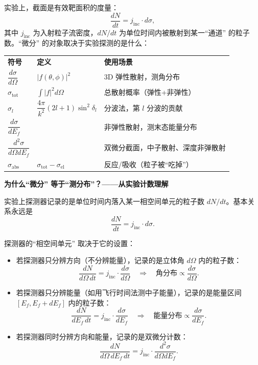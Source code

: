 \begin{derivationbox}[``截面'' 家族：各种微分截面的定义]

实验上，截面是有效靶面积的度量：
\[
\frac{dN}{dt} = j_{\text{inc}} \cdot d\sigma,
\]
其中 $j_{\text{inc}}$ 为入射粒子流密度，$dN/dt$ 为单位时间内被散射到某一``通道'' 的粒子数。``微分'' 的对象取决于实验探测的是什么：

\begin{tabular}{lll}
\textbf{符号} & \textbf{定义} & \textbf{使用场景} \\
$\dfrac{d\sigma}{d\Omega}$ & $|f(\theta,\phi)|^2$ & 3D 弹性散射，测角分布 \\
$\sigma_{\text{tot}}$ & $\int |f|^2 d\Omega$ & 总散射概率（弹性+非弹性） \\
$\sigma_l$ & $\dfrac{4\pi}{k^2}(2l+1)\sin^2\delta_l$ & 分波法，第 $l$ 分波的贡献 \\
$\dfrac{d\sigma}{dE_f}$ & & 非弹性散射，测末态能量分布 \\
$\dfrac{d^2\sigma}{d\Omega dE_f}$ & & 双微分截面，中子散射、深度非弹散射 \\
$\sigma_{\text{abs}}$ & $\sigma_{\text{tot}} - \sigma_{\text{el}}$ & 反应/吸收（粒子被``吃掉''） \\
\end{tabular}

\textbf{为什么``微分'' 等于``测分布''？——从实验计数理解}

实验上探测器记录的是单位时间内落入某一相空间单元的粒子数 $dN/dt$。基本关系永远是
\[
\frac{dN}{dt} = j_{\text{inc}} \cdot d\sigma.
\]

探测器的``相空间单元'' 取决于它的设置：
\begin{itemize}
    \item 若探测器只分辨方向（不分辨能量），记录的是立体角 $d\Omega$ 内的粒子数：
    \[
    \frac{dN}{d\Omega\, dt} = j_{\text{inc}} \cdot \frac{d\sigma}{d\Omega} \quad \Longrightarrow \quad \text{角分布} \propto \frac{d\sigma}{d\Omega}.
    \]
    \item 若探测器只分辨能量（如用飞行时间法测中子能量），记录的是能量区间 $[E_f, E_f + dE_f]$ 内的粒子数：
    \[
    \frac{dN}{dE_f\, dt} = j_{\text{inc}} \cdot \frac{d\sigma}{dE_f} \quad \Longrightarrow \quad \text{能量分布} \propto \frac{d\sigma}{dE_f}.
    \]
    \item 若探测器同时分辨方向和能量，记录的是双微分计数：
    \[
    \frac{dN}{d\Omega\, dE_f\, dt} = j_{\text{inc}} \cdot \frac{d^2\sigma}{d\Omega dE_f}.
    \]
\end{itemize}


\end{derivationbox}
